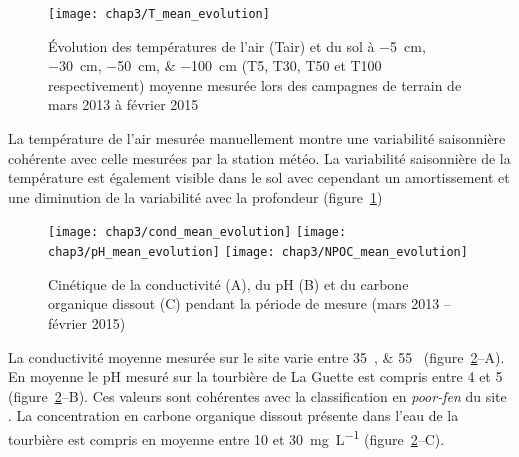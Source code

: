 \begin{figure}
\centering
\texttt{[image: chap3/T\_mean\_evolution]}
\caption{Évolution des températures de l'air (Tair) et du sol à \SIlist{-5;-30;-50;-100}{\centi\metre} (T5, T30, T50 et T100 respectivement) moyenne mesurée lors des campagnes de terrain de mars 2013 à février 2015}
\label{fig:T_mean_evolution}
\end{figure}

La température de l'air mesurée manuellement montre une variabilité saisonnière cohérente avec celle mesurées par la station météo. 
La variabilité saisonnière de la température est également visible dans le sol avec cependant un amortissement et une diminution de la variabilité avec la profondeur (figure~\ref{fig:T_mean_evolution})

\begin{figure}
\centering
\texttt{[image: chap3/cond\_mean\_evolution]}
\texttt{[image: chap3/pH\_mean\_evolution]}
\texttt{[image: chap3/NPOC\_mean\_evolution]}
\caption{Cinétique de la conductivité (A), du pH (B) et du carbone organique dissout (C) pendant la période de mesure (mars 2013 -- février 2015)}
\label{fig:wtr_phychim}
\end{figure}



%

La conductivité moyenne mesurée sur le site varie entre \SIlist{35;55}{\usml} (figure~\ref{fig:wtr_phychim}--A).
En moyenne le pH mesuré sur la tourbière de La Guette est compris entre 4 et 5 (figure~\ref{fig:wtr_phychim}--B).
Ces valeurs sont cohérentes avec la classification en \textit{poor-fen} du site .
La concentration en carbone organique dissout présente dans l'eau de la tourbière est compris en moyenne entre \num{10} et \SI{30}{\milli\gram\per\liter} (figure~\ref{fig:wtr_phychim}--C).



